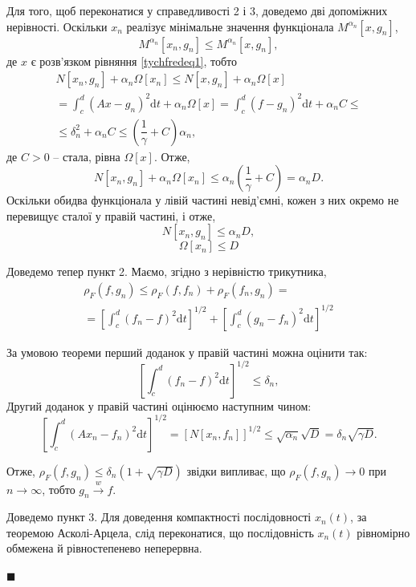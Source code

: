 \documentclass[14pt,twoside]{extreport}
\theoremstyle{mystyle}
\renewenvironment{proof}{{\bfseries Доведення.}}{$\blacksquare$}
\numberwithin{equation}{chapter}
\begin{document}
\begin{proof}
Для того, щоб переконатися у справедливості 2 і 3, доведемо дві допоміжних нерівності. Оскільки $x_n$ реалізує мінімальне значення функціонала $M^{\alpha_n}[x, g_n]$,
\[
M^{\alpha_n}[x_n, g_n] \leqslant M^{\alpha_n}[x, g_n],
\]
де $x$ є розв'язком рівняння \eqref{tychfredeq1}, тобто
\begin{multline*}
 N[x_n, g_n] + \alpha_n \Omega[x_n] \leqslant N[x, g_n] + \alpha_n \Omega[x]\\
 = \int_{c}^{d} (Ax - g_n)^2 \mathrm{d}t + \alpha_n \Omega[x] = \int_{c}^{d} (f - g_n)^2 \mathrm{d}t + \alpha_n C \leqslant \\
 \leqslant \delta_n^2 + \alpha_n C \leqslant \left(\dfrac{1}{\gamma} + C\right) \alpha_n,
\end{multline*}
де $C > 0$ -- стала, рівна $\Omega[x]$. Отже,
\[
 N[x_n, g_n] + \alpha_n \Omega[x_n] \leqslant \alpha_n \left(\dfrac{1}{\gamma} + C\right) = \alpha_n D.
\]
Оскільки обидва функціонала у лівій частині невід'ємні, кожен з них окремо не перевищує сталої у правій частині, і отже,
\begin{equation}
 N[x_n, g_n]\leqslant \alpha_{n} D,
\end{equation}
\begin{equation}\label{omegaxn}
 \Omega[x_{n}]\leqslant D
\end{equation}

Доведемо тепер пункт 2. Маємо, згідно з нерівністю трикутника,
\begin{multline*}
\rho_{F}(f, g_n)\leqslant\rho_{F}(f, f_{n})+\rho_{F}(f_{n}, g_{n})=\\
= \left[\int_{c}^{d}(f_{n}-f)^{2}\mathrm{d}t\right]^{1/2} + \left[\int_{c}^{d}(g_{n}-f_{n})^{2}\mathrm{d}t\right]^{1/2}
\end{multline*}

За умовою теореми перший доданок у правій частині можна оцінити так:
$$
\left[\int_{c}^{d}(f_{n}-f)^{2}\mathrm{d}t\right]^{1/2} \leqslant \delta_{n},
$$
Другий доданок у правій частині оцінюємо наступним чином:
$$
\left[\int_{c}^{d}(Ax_{n}-f_{n})^{2}\mathrm{d}t\right]^{1/2} = \left[N[x_{n}, f_{n}]\right]^{1/2} \leqslant \sqrt{\alpha_{n}}\sqrt{D}=\delta_n\sqrt{\gamma D}.
$$

Отже, $\rho_{F}(f, g_n) \leqslant \delta_{n}(1+\sqrt{\gamma D})$ звідки випливає, що $\rho_{F}(f, g_{n})\to 0$ при $n \to\infty$, тобто $g_n \xrightarrow{w} f$.

Доведемо пункт 3. Для доведення компактності послідовності $x_n(t)$, за теоремою Асколі-Арцела, слід переконатися, що послідовність $x_n(t)$ рівномірно обмежена й рівностепенево неперервна.


\end{proof}
\end{document}
